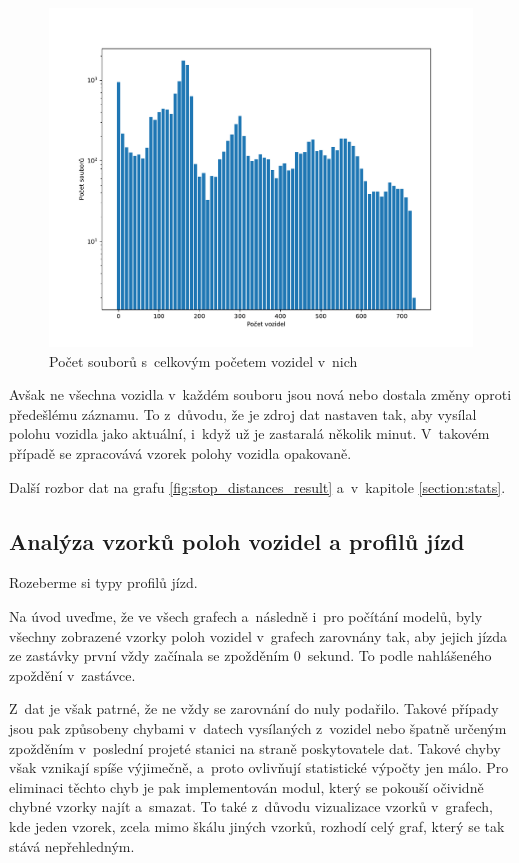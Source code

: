 \begin{figure}
	\centering
  \includegraphics[width=\linewidth]{../img/all_trips}
  \caption{Počet souborů s~celkovým početem vozidel v~nich}
  \label{fig:vehicle_pos_x_all_trips}
\end{figure}

\bigbreak

Avšak ne všechna vozidla v~každém souboru jsou nová nebo dostala změny oproti předešlému záznamu. To z~důvodu, že je zdroj dat nastaven tak, aby vysílal polohu vozidla jako aktuální, i~když už je zastaralá několik minut. V~takovém případě se zpracovává vzorek polohy vozidla opakovaně.

\bigbreak

Další rozbor dat na grafu \ref{fig:stop_distances_result} a~v~kapitole \ref{section:stats}.


\subsection{Analýza vzorků poloh vozidel a profilů jízd}

Rozeberme si typy profilů jízd.

\bigbreak

Na úvod uveďme, že ve všech grafech a~následně i~pro počítání modelů, byly všechny zobrazené vzorky poloh vozidel v~grafech zarovnány tak, aby jejich jízda ze zastávky první vždy začínala se zpožděním 0~sekund. To podle nahlášeného zpoždění v~zastávce.


\bigbreak

Z~dat je však patrné, že ne vždy se zarovnání do nuly podařilo. Takové případy jsou pak způsobeny chybami v~datech vysílaných z~vozidel nebo špatně určeným zpožděním v~poslední projeté stanici na straně poskytovatele dat. Takové chyby však vznikají spíše výjimečně, a~proto ovlivňují statistické výpočty jen málo. Pro eliminaci těchto chyb je pak implementován modul, který se pokouší očividně chybné vzorky najít a~smazat. To také z~důvodu vizualizace vzorků v~grafech, kde jeden vzorek, zcela mimo škálu jiných vzorků, rozhodí celý graf, který se tak stává nepřehledným.


